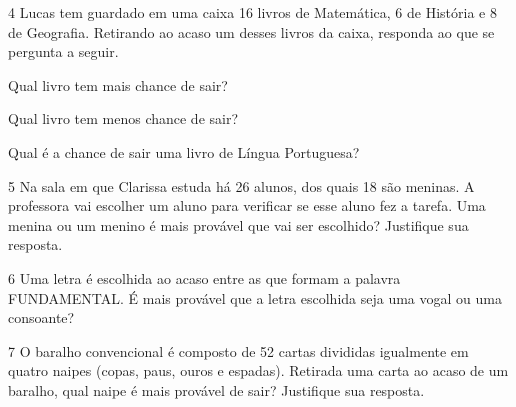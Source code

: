 \num{4} Lucas tem guardado em uma caixa 16 livros de Matemática, 6 de História e
8 de Geografia. Retirando ao acaso um desses livros da caixa, responda ao que se pergunta a seguir.

\begin{escolha}
\item
  Qual livro tem mais chance de sair?


\item
  Qual livro tem menos chance de sair?


\item
  Qual é a chance de sair uma livro de Língua Portuguesa?

\end{escolha}

\pagebreak
\num{5} Na sala em que Clarissa estuda há 26 alunos, dos quais 18 são meninas. A
professora vai escolher um aluno para verificar se esse aluno fez a tarefa.
Uma menina ou um menino é mais provável que vai ser escolhido? Justifique sua resposta.

\begin{mdframed}[linewidth=2pt,linecolor=salmao,roundcorner=2pt]



\end{mdframed}

\num{6} Uma letra é escolhida ao acaso entre as que formam a palavra
FUNDAMENTAL. É mais provável que a letra escolhida seja uma vogal ou uma consoante?

\begin{mdframed}[linewidth=2pt,linecolor=salmao,roundcorner=2pt]



\end{mdframed}

\num{7} O baralho convencional é composto de 52 cartas divididas igualmente em quatro
naipes (copas, paus, ouros e espadas). Retirada uma carta ao acaso de um baralho,
qual naipe é mais provável de sair? Justifique sua resposta.


